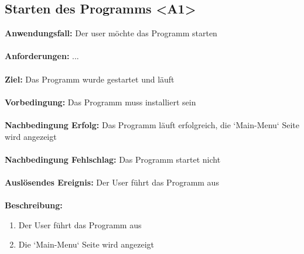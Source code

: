 \documentclass[parskip=full]{scrartcl} %
\begin{document}
\subsection*{Starten des Programms <A1>}
\textbf{Anwendungsfall:}  Der user möchte das Programm starten\\\\
\textbf{Anforderungen:} ...\\\\
\textbf{Ziel:} Das Programm wurde gestartet und läuft \\\\
\textbf{Vorbedingung:} Das Programm muss installiert sein  \\\\
\textbf{Nachbedingung Erfolg:} Das Programm läuft erfolgreich, die `Main-Menu` Seite wird angezeigt\\\\
\textbf{Nachbedingung Fehlschlag:} Das Programm startet nicht \\\\
\textbf{Auslösendes Ereignis:} Der User führt das Programm aus \\\\
\textbf{Beschreibung:}
\begin{enumerate}
    \item Der User führt das Programm aus
    \item Die `Main-Menu` Seite wird angezeigt
\end{enumerate}
\newpage
\end{document}
